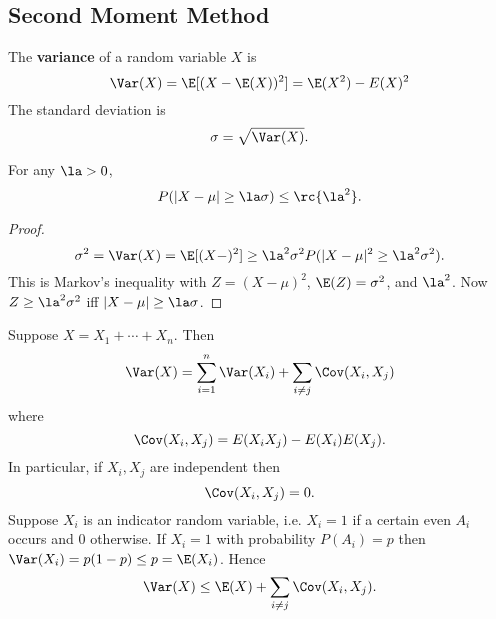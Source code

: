 
\subsection{Second Moment Method}
\begin{df}
The \textbf{variance} of a random variable $X$ is
\[
\Var(X)=\E[(X-\E(X))^2]=\E(X^2)-E(X)^2
\]
The standard deviation is
\[
\sigma=\sqrt{\Var(X)}.
\]
\end{df}
\begin{thm}
For any $\la>0$,
\[
P(|X-\mu|\geq \la \sigma)\leq \rc{\la^2}.
\]
\end{thm}
\begin{proof}
\[\sigma^2=\Var(X)=\E[(X-)^2]\geq \la^2 \sigma^2 P(|X-\mu|^2\geq \la^2\sigma^2).\]
This is Markov's inequality with $Z=(X-\mu)^2$, $\E(Z)=\sigma^2$, and $\la^2$. Now $Z\geq \la^2 \sigma^2$ iff $|X-\mu|\geq \la \sigma$.
\end{proof}
Suppose $X=X_1+\cdots +X_n$. Then
\[
\Var(X)=\sum_{i=1}^n \Var(X_i)+\sum_{i\neq j} \Cov(X_i,X_j)
\]
where
\[
\Cov(X_i,X_j)=E(X_iX_j)-E(X_i)E(X_j).
\]
In particular, if $X_i,X_j$ are independent then
\[
\Cov(X_i,X_j)=0.
\]
Suppose $X_i$ is an indicator random variable, i.e. $X_i=1$ if a certain even $A_i$ occurs and 0 otherwise. If $X_i=1$ with probability $P(A_i)=p$ then $\Var(X_i)=p(1-p)\leq p=\E(X_i)$. Hence
\[
\Var(X)\leq \E(X)+\sum_{i\neq j} \Cov(X_i,X_j).
\]

